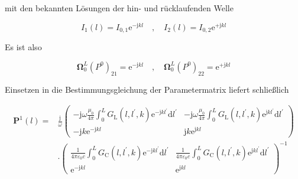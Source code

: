 mit den bekannten Lösungen der hin- und rücklaufenden Welle


\begin{equation}
	I_{1}(l)=I_{0,1} \mathrm{e}^{-\mathrm{j} k l} \quad, \quad I_{2}(l)=I_{0,2} \mathrm{e}^{+\mathrm{j} k l} 
\end{equation}


Es ist also


\begin{equation}
	\boldsymbol{\Omega}_{0}^{L}\left(P^{0}\right)_{21}=\mathrm{e}^{-\mathrm{j} k l} \quad, \quad \boldsymbol{\Omega}_{0}^{L}\left(P^{0}\right)_{22}=\mathrm{e}^{+\mathrm{j} k l} 
\end{equation}


Einsetzen in die Bestimmungsgleichung der Parametermatrix liefert schließlich


\begin{equation}\begin{split}
		\mathbf{P}^{1}(l)= & \frac{\mathrm{j}}{\omega}\left(\begin{array}{cc}
			-\mathrm{j} \omega \frac{\mu_{0}}{4 \pi} \int_{0}^{L} G_{\mathrm{L}}\left(l, l^{\prime}, k\right) \mathrm{e}^{-\mathrm{j} k l^{\prime}} \mathrm{d} l^{\prime} & -\mathrm{j} \omega \frac{\mu_{0}}{4 \pi} \int_{0}^{L} G_{\mathrm{L}}\left(l, l^{\prime}, k\right) \mathrm{e}^{\mathrm{j} k l^{\prime}} \mathrm{d} l^{\prime} \\
			-\mathrm{j} k \mathrm{e}^{-\mathrm{j} k l} & \mathrm{j} k \mathrm{e}^{\mathrm{j} k l}
		\end{array}\right) \\
		& \cdot\left(\begin{array}{cc}
			\frac{1}{4 \pi \varepsilon_{0} c} \int_{0}^{L} G_{\mathrm{C}}\left(l, l^{\prime}, k\right) \mathrm{e}^{-\mathrm{j} k l^{\prime}} \mathrm{d} l^{\prime} & \frac{1}{4 \pi \varepsilon_{0} c} \int_{0}^{L} G_{\mathrm{C}}\left(l, l^{\prime}, k\right) \mathrm{e}^{\mathrm{j} k l^{\prime}} \mathrm{d} l^{\prime} \\
			\mathrm{e}^{-\mathrm{j} k l} & \mathrm{e}^{\mathrm{j} k l}
		\end{array}\right)^{-1} 
\end{split}\end{equation}
\fi
